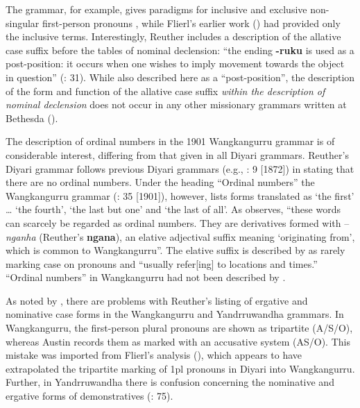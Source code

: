 The \citeyear{reuther_repr_1899} grammar, for example, gives paradigms for inclusive and exclusive non-singular first-person pronouns \citep[36]{a_three_1981}, while Flierl’s earlier work (\citeyear{flierl_christianieli_1880}) had provided only the inclusive terms. Interestingly, Reuther includes a description of the allative case suffix before the tables of nominal declension: “the ending \textbf{-ruku} is used as a post-position: it occurs when one wishes to imply movement towards the object in question” (\citealt{a_three_1981}: 31). While also described here as a ``post-position'', the description of the form and function of the allative case suffix \textit{within the description of nominal declension} does not occur in any other missionary grammars written at Bethesda ().

The description of ordinal numbers in the 1901 Wangkangurru grammar is of considerable interest, differing from that given in all Diyari grammars. Reuther’s Diyari grammar follows previous Diyari grammars (e.g., \citealt{schoknecht_grammar_1947}: 9 [1872]) in stating that there are no ordinal numbers. Under the heading “Ordinal numbers” the Wangkangurru grammar (\citeyear{a_three_1981}: 35 [1901]), however, lists forms translated as `the first' … `the fourth', `the last but one' and `the last of all'. As \citet[54]{austin_notitle_1981} observes, “these words can scarcely be regarded as ordinal numbers. They are derivatives formed with –\textit{nganha} (Reuther’s \textbf{ngana}), an elative adjectival suffix meaning `originating from', which is common to Wangkangurru”. The elative suffix is described by \citet[108]{hercus_grammar_1994} as rarely marking case on pronouns and “usually refer[ing] to locations and times.'' “Ordinal numbers” in Wangkangurru had not been described by \citet{flierl_dieri_1880}.

As noted by \citet[54]{austin_notitle_1981}, there are problems with Reuther’s listing of ergative and nominative case forms in the Wangkangurru and Yandrruwandha grammars. In Wangkangurru, the first-person plural pronouns are shown as tripartite (A/S/O), whereas Austin records them as marked with an accusative system (AS/O). This mistake was imported from Flierl’s analysis (), which appears to have extrapolated the tripartite marking of 1pl pronouns in Diyari into Wangkangurru. Further, in Yandrruwandha there is confusion concerning the nominative and ergative forms of demonstratives (\citeyear{austin_notitle_1981}: 75).

